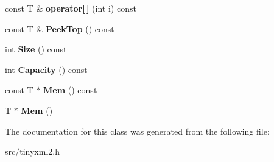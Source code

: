 \begin{DoxyCompactItemize}
\item 
const T \& {\bfseries operator\mbox{[}$\,$\mbox{]}} (int i) const \hypertarget{classtinyxml2_1_1_dyn_array_ac97d6ddabbcdb098f155e7fc11ea5d91}{}\label{classtinyxml2_1_1_dyn_array_ac97d6ddabbcdb098f155e7fc11ea5d91}

\item 
const T \& {\bfseries Peek\+Top} () const \hypertarget{classtinyxml2_1_1_dyn_array_a5658d49c056707f14b089b53c358eb11}{}\label{classtinyxml2_1_1_dyn_array_a5658d49c056707f14b089b53c358eb11}

\item 
int {\bfseries Size} () const \hypertarget{classtinyxml2_1_1_dyn_array_a5c3874dd4d5d0bf32919161b19ac7287}{}\label{classtinyxml2_1_1_dyn_array_a5c3874dd4d5d0bf32919161b19ac7287}

\item 
int {\bfseries Capacity} () const \hypertarget{classtinyxml2_1_1_dyn_array_a5ab6ef31e984e5cf78d0eb70ad3aec6d}{}\label{classtinyxml2_1_1_dyn_array_a5ab6ef31e984e5cf78d0eb70ad3aec6d}

\item 
const T $\ast$ {\bfseries Mem} () const \hypertarget{classtinyxml2_1_1_dyn_array_aef95a07fb624948d8ce3e638ab2e1f8b}{}\label{classtinyxml2_1_1_dyn_array_aef95a07fb624948d8ce3e638ab2e1f8b}

\item 
T $\ast$ {\bfseries Mem} ()\hypertarget{classtinyxml2_1_1_dyn_array_a2f0842cd666e2ad951f1a8bd6561fa40}{}\label{classtinyxml2_1_1_dyn_array_a2f0842cd666e2ad951f1a8bd6561fa40}

\end{DoxyCompactItemize}


The documentation for this class was generated from the following file\+:\begin{DoxyCompactItemize}
\item 
src/tinyxml2.\+h\end{DoxyCompactItemize}
